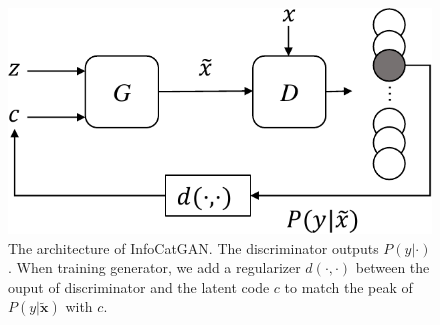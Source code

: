 \begin{figure}[htbp]
  \centering
  \includegraphics[width=\onef\textwidth]{Img/icg-arch.pdf} 
  {The architecture of InfoCatGAN. The discriminator outputs $P(y|\cdot)$. When training generator, we add a regularizer $d(\cdot,\cdot)$ between the ouput of discriminator and the latent code $c$ to match the peak of $P(y|\tilde{\mathbf{x}})$ with $c$.}
  \label{fig:icg-arch}
\end{figure}

